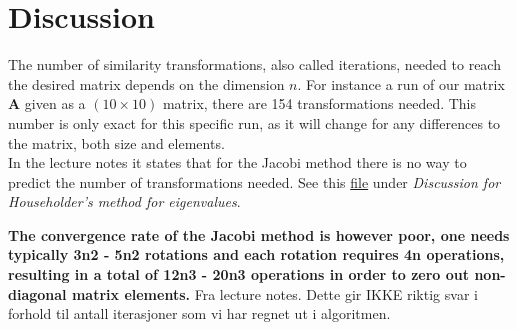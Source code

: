 \documentclass{article}
\begin{document}
\vspace{1cm}

\section{Discussion} \label{sec:Discussion}

  The number of similarity transformations, also called iterations, needed to reach the desired matrix depends on the dimension $n$. For instance a run of our matrix \textbf{A} given as a $(10 \times 10)$ matrix, there are 154 transformations needed. This number is only exact for this specific run, as it will change for any differences to the matrix, both size and elements. \\

  In the lecture notes it states that for the Jacobi method there is no way to predict the number of transformations needed. See this \href{http://compphysics.github.io/ComputationalPhysics/doc/pub/eigvalues/html/eigvalues.html}{file} under \textit{Discussion for Householder's method for eigenvalues}.

  \textbf{The convergence rate of the Jacobi method is however poor, one needs typically 3n2 - 5n2 rotations and each rotation requires 4n operations, resulting in a total of 12n3 - 20n3 operations in order to zero out non-diagonal matrix elements.} Fra lecture notes. Dette gir IKKE riktig svar i forhold til antall iterasjoner som vi har regnet ut i algoritmen. \\
\end{document}
